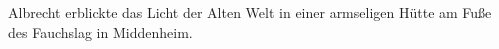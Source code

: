 
Albrecht erblickte das Licht der Alten Welt in einer armseligen Hütte am Fuße des Fauchslag in Middenheim.
